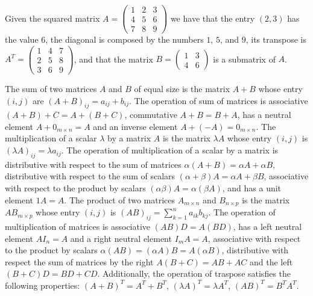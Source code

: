 \begin{example}
Given the squared matrix $A = \left( \begin{smallmatrix} 1 & 2 & 3 \\ 4 & 5 & 6 \\ 7 & 8 & 9 \end{smallmatrix} \right)$ we have that the entry $(2, 3)$ has the value $6$, the diagonal is composed by the numbers $1$, $5$, and $9$, its transpose is $A^T = \left( \begin{smallmatrix} 1 & 4 & 7 \\ 2 & 5 & 8 \\ 3 & 6 & 9 \end{smallmatrix} \right)$, and that the matrix $B = \left( \begin{smallmatrix} 1 & 3 \\ 4 & 6 \end{smallmatrix} \right)$ is a submatrix of $A$.
\end{example}

The sum of two matrices $A$ and $B$ of equal size is the matrix $A + B$ whose entry $(i, j)$ are $(A + B)_{ij} = a_{ij} + b_{ij}$. The operation of sum of matrices is associative $(A + B) + C = A + (B + C)$, commutative $A + B = B + A$, has a neutral element $A + 0_{m \times n} = A$ and an inverse element $A + (-A) = 0_{m \times n}$. The multiplication of a scalar $\lambda$ by a matrix $A$ is the matrix $\lambda A$ whose entry $(i, j)$ is $(\lambda A)_{ij} = \lambda a_{ij}$. The operation of multiplication of a scalar by a matrix is distributive with respect to the sum of matrices $\alpha (A + B) = \alpha A + \alpha B$, distributive with respect to the sum of scalars $(\alpha + \beta) A = \alpha A + \beta B$, associative with respect to the product by scalars $(\alpha \beta) A = \alpha (\beta A)$, and has a unit element $1 A = A$. The product of two matrices $A_{m \times n}$ and $B_{n \times p}$ is the matrix $AB_{m \times p}$ whose entry $(i, j)$ is $(AB)_{ij} = \sum_{k=1}^n a_{ik} b_{kj}$. The operation of multiplication of matrices is associative $(A B) D = A (B D)$, has a left neutral element $A I_n = A$ and a right neutral element $I_m A = A$, associative with respect to the product by scalars $\alpha (A B) = (\alpha A) B = A (\alpha B)$, distributive with respect the sum of matrices by the right $A (B + C) = AB + AC$ and the left $(B + C) D = B D + C D$. Additionally, the operation of traspose satisfies the following properties: $(A + B)^T = A^T + B^T$, $(\lambda A)^T = \lambda A^T$, $(A B)^T = B^T A^T$.

